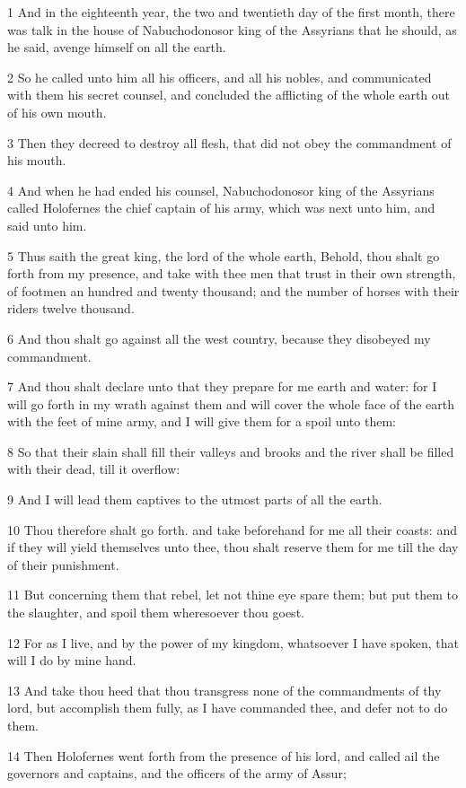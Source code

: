 \par 1 And in the eighteenth year, the two and twentieth day of the first month, there was talk in the house of Nabuchodonosor king of the Assyrians that he should, as he said, avenge himself on all the earth.
\par 2 So he called unto him all his officers, and all his nobles, and communicated with them his secret counsel, and concluded the afflicting of the whole earth out of his own mouth.
\par 3 Then they decreed to destroy all flesh, that did not obey the commandment of his mouth.
\par 4 And when he had ended his counsel, Nabuchodonosor king of the Assyrians called Holofernes the chief captain of his army, which was next unto him, and said unto him.
\par 5 Thus saith the great king, the lord of the whole earth, Behold, thou shalt go forth from my presence, and take with thee men that trust in their own strength, of footmen an hundred and twenty thousand; and the number of horses with their riders twelve thousand.
\par 6 And thou shalt go against all the west country, because they disobeyed my commandment.
\par 7 And thou shalt declare unto that they prepare for me earth and water: for I will go forth in my wrath against them and will cover the whole face of the earth with the feet of mine army, and I will give them for a spoil unto them:
\par 8 So that their slain shall fill their valleys and brooks and the river shall be filled with their dead, till it overflow:
\par 9 And I will lead them captives to the utmost parts of all the earth.
\par 10 Thou therefore shalt go forth. and take beforehand for me all their coasts: and if they will yield themselves unto thee, thou shalt reserve them for me till the day of their punishment.
\par 11 But concerning them that rebel, let not thine eye spare them; but put them to the slaughter, and spoil them wheresoever thou goest.
\par 12 For as I live, and by the power of my kingdom, whatsoever I have spoken, that will I do by mine hand.
\par 13 And take thou heed that thou transgress none of the commandments of thy lord, but accomplish them fully, as I have commanded thee, and defer not to do them.
\par 14 Then Holofernes went forth from the presence of his lord, and called ail the governors and captains, and the officers of the army of Assur;
